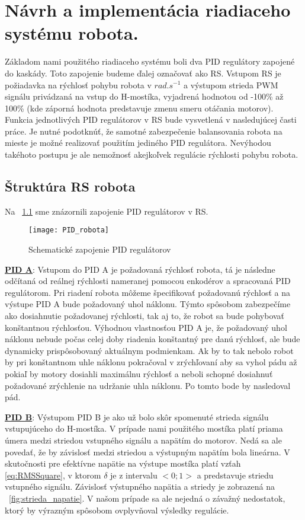 \chapter{Návrh a implementácia riadiaceho systému robota.}
Základom nami použitého riadiaceho systému boli dva PID regulátory zapojené do kaskády. Toto zapojenie budeme ďalej označovať ako \ac{RS}. Vstupom RS je požiadavka na rýchlosť pohybu robota v $rad.s^{-1}$ a výstupom strieda PWM signálu privádzaná na vstup do H-mostíka, vyjadrená hodnotou od -100\% až 100\% (kde záporná hodnota predstavuje zmenu smeru otáčania motorov). Funkcia jednotlivých PID regulátorov v RS bude vysvetlená v nasledujúcej časti práce. Je nutné podotknúť, že samotné zabezpečenie balansovania robota na mieste je možné realizovať použitím jediného PID regulátora. Nevýhodou takéhoto postupu je ale nemožnosť akejkoľvek regulácie rýchlosti pohybu robota. 

\section{Štruktúra RS robota}

Na \figurename~\ref{fig:RS} sme znázornili zapojenie PID regulátorov v RS.  

\begin{figure}[h]
\centering
\texttt{[image: PID\_robota]}
\caption{Schematické zapojenie PID regulátorov}
\label{fig:RS}
\end{figure}

\underline{\textbf{PID A}}:
Vstupom do PID A je požadovaná rýchlosť robota, tá je následne odčítaná od reálnej rýchlosti nameranej pomocou enkodérov a spracovaná PID regulátorom. Pri riadení robota môžeme špecifikovať požadovanú rýchlosť a na výstupe PID A bude požadovaný uhol náklonu. Týmto spôsobom zabezpečíme ako dosiahnutie požadovanej rýchlosti, tak aj to, že robot sa bude pohybovať konštantnou rýchlosťou. Výhodnou vlastnosťou PID A je, že požadovaný uhol náklonu nebude počas celej doby riadenia konštantný pre danú rýchlosť, ale bude dynamicky prispôsobovaný aktuálnym podmienkam. Ak by to tak nebolo robot by pri konštantnom uhle náklonu pokračoval v zrýchľovaní aby sa vyhol pádu až pokiaľ by motory dosiahli maximálnu rýchlosť a neboli schopné dosiahnuť požadované zrýchlenie na udržanie uhla náklonu. Po tomto bode by nasledoval pád.

\underline{\textbf{PID B}}:
Výstupom PID B je ako už bolo skôr spomenuté strieda signálu vstupujúceho do H-mostíka. V prípade nami použitého mostíka platí priama úmera medzi striedou vstupného signálu a napätím do motorov. Nedá sa ale povedať, že by závislosť medzi striedou a výstupným napätím bola lineárna. V skutočnosti pre efektívne napätie na výstupe mostíka platí vzťah \eqref{eq:RMSSquare}, v ktorom $\delta$ je z intervalu $<0;1>$ a predstavuje striedu vstupného signálu. Závislosť výstupného napätia a striedy je zobrazená na \figurename~\ref{fig:strieda_napatie}. V našom prípade sa ale nejedná o závažný nedostatok, ktorý by výrazným spôsobom ovplyvňoval výsledky regulácie.

